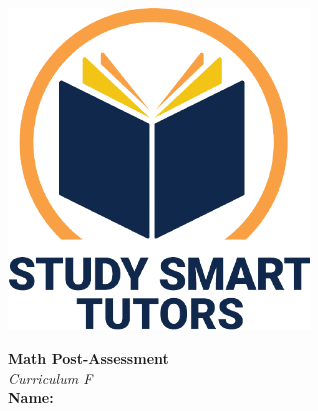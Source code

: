 \documentclass[12pt]{article}
\begin{document}


\newpage
\thispagestyle{empty}
\vspace*{\fill}

\vspace*{10cm}




\newpage





\thispagestyle{empty}

\vspace*{\fill}

\vspace*{3cm}

\begin{center}

    \includegraphics[width=0.6\textwidth]{SST_Color_Logo.png} %
    
    \vspace{2cm} %
    

    
   \Huge \textbf{ Math Post-Assessment}\\
    \LARGE \textit{Curriculum F}\\  
    [2cm]

    \LARGE \textbf{Name:} \underline{\hspace{8cm}}
   
    
    \vfill %
    
\end{center}
\end{document}

